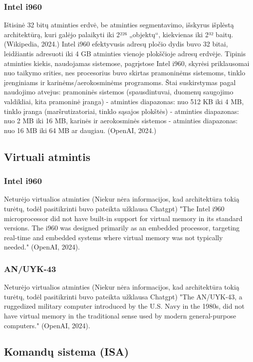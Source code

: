 \documentclass{article}
\begin{document}
\subsubsection{Intel i960}
Ištisinė 32 bitų atminties erdvė, be atminties segmentavimo, išskyrus išplėstą architektūrą, kuri galėjo palaikyti iki 2²²⁶ „objektų“, kiekvienas iki 2³² baitų. (Wikipedia, 2024.) Intel i960 efektyvusis adresų pločio dydis buvo 32 bitai, leidžiantis adresuoti iki 4 GB atminties vienoje plokščioje adresų erdvėje. Tipinis atminties kiekis, naudojamas sistemose, pagrįstose Intel i960, skyrėsi priklausomai nuo taikymo srities, nes procesorius buvo skirtas pramoninėms sistemoms, tinklo įrenginiams ir karinėms/aerokosminėms programoms. Štai suskirstymas pagal naudojimo atvejus: pramoninės sistemos (spausdintuvai, duomenų saugojimo valdikliai, kita pramoninė įranga) - atminties diapazonas: nuo 512 KB iki 4 MB, tinklo įranga (maršrutizatoriai, tinklo sąsajos plokštės) - atminties diapazonas: nuo 2 MB iki 16 MB, karinės ir aerokosminės sistemos - atminties diapazonas: nuo 16 MB iki 64 MB ar daugiau. (OpenAI, 2024.)
\subsection{Virtuali atmintis}
\subsubsection{Intel i960}
Neturėjo virtualios atminties (Niekur nėra informacijos, kad architektūra tokią turėtų, todėl pasitikrinti buvo pateikta užklausa Chatgpt) "The Intel i960 microprocessor did not have built-in support for virtual memory in its standard versions. The i960 was designed primarily as an embedded processor, targeting real-time and embedded systems where virtual memory was not typically needed." (OpenAI, 2024).
\subsubsection{AN/UYK-43}
Neturėjo virtualios atminties (Niekur nėra informacijos, kad architektūra tokią turėtų, todėl pasitikrinti buvo pateikta užklausa Chatgpt) "The AN/UYK-43, a ruggedized military computer introduced by the U.S. Navy in the 1980s, did not have virtual memory in the traditional sense used by modern general-purpose computers." (OpenAI, 2024).
\subsection{Komandų sistema (ISA)}
\end{document}
